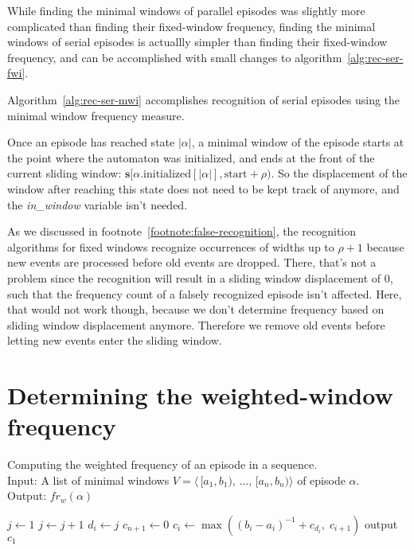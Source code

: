 While finding the minimal windows of parallel episodes was slightly more complicated than finding their fixed-window frequency, finding the minimal windows of serial episodes is actuallly simpler than finding their fixed-window frequency, and can be accomplished with small changes to algorithm~\ref{alg:rec-ser-fwi}.

Algorithm~\ref{alg:rec-ser-mwi} accomplishes recognition of serial episodes using the minimal window frequency measure.

Once an episode has reached state $ | \alpha | $, a minimal window of the episode starts at the point where the automaton was initialized, and ends at the front of the current sliding window: $ \boldsymbol{s}[\alpha \text{.initialized}[| \alpha |], \text{start} + \rho) $. So the displacement of the window after reaching this state does not need to be kept track of anymore, and the \emph{in\_window} variable isn't needed.

As we discussed in footnote~\ref{footnote:false-recognition}, the recognition algorithms for fixed windows recognize occurrences of widths up to $ \rho + 1 $ because new events are processed before old events are dropped. There, that's not a problem since the recognition will result in a sliding window displacement of $ 0 $, such that the frequency count of a falsely recognized episode isn't affected. Here, that would not work though, because we don't determine frequency based on sliding window displacement anymore. Therefore we remove old events before letting new events enter the sliding window.



\section{Determining the weighted-window frequency}

\begin{algorithm}

\caption{Computing the weighted frequency of an episode in a sequence.\\
Input: A list of minimal windows $ V = \langle \, [a_1, b_1), \, \ldots, \, [a_n, b_n) \rangle $ of episode $ \alpha $.\\
Output: $ fr_w(\alpha) $
}

\begin{algorithmic}[1]

\State $ j \gets 1 $
\ForAll {$ [a_i, b_i) \in V $} \label{alglin:wwi:begin-next-disjoint-window}
        \State $ j \gets j + 1 $
    \EndWhile
    \State $ d_i \gets j $ \label{alglin:wwi:end-next-disjoint-window}
\EndFor
\State $ c_{n + 1} \gets 0 $ \label{alglin:wwi:begin-wwi-calculation}
    \State $ c_i \gets \max((b_i - a_i)^{-1} + c_{d_i}, \; c_{i+1}) $ \label{alglin:wwi:end-wwi-calculation}
\EndFor
\State output $ c_1 $

\end{algorithmic}

\label{alg:wwi}
\end{algorithm}

